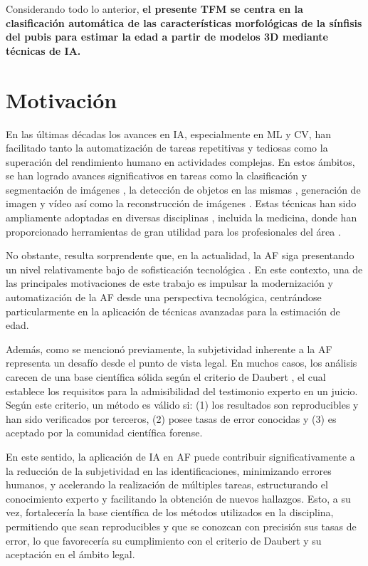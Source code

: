 Considerando todo lo anterior, \textbf{el presente TFM se centra en la clasificación automática de las características morfológicas de la sínfisis del pubis para estimar la edad a partir de modelos 3D mediante técnicas de IA.}

\section{Motivación}
En las últimas décadas los avances en IA, especialmente en ML y CV, han facilitado tanto la automatización de tareas repetitivas y tediosas como la superación del rendimiento humano en actividades complejas. En estos ámbitos, se han logrado avances significativos en tareas como la clasificación y segmentación de imágenes \cite{edozie_comprehensive_2025}, la detección de objetos en las mismas \cite{liu_deep_2020}, generación de imagen y vídeo \cite{wang_generative_2021} así como la reconstrucción de imágenes \cite{xie_review_2022}. Estas técnicas han sido ampliamente adoptadas en diversas disciplinas \cite{chai_deep_2021}, incluida la medicina, donde han proporcionado herramientas de gran utilidad para los profesionales del área \cite{esteva_deep_2021}.

No obstante, resulta sorprendente que, en la actualidad, la AF siga presentando un nivel relativamente bajo de sofisticación tecnológica \cite{RefWorks:RefID:21-mesejo2020survey}. En este contexto, una de las principales motivaciones de este trabajo es impulsar la modernización y automatización de la AF desde una perspectiva tecnológica, centrándose particularmente en la aplicación de técnicas avanzadas para la estimación de edad.

Además, como se mencionó previamente, la subjetividad inherente a la AF representa un desafío desde el punto de vista legal. En muchos casos, los análisis carecen de una base científica sólida según el criterio de Daubert \cite{noauthor_daubert_nodate}, el cual establece los requisitos para la admisibilidad del testimonio experto en un juicio. Según este criterio, un método es válido si: (1) los resultados son reproducibles y han sido verificados por terceros, (2) posee tasas de error conocidas y (3) es aceptado por la comunidad científica forense.

En este sentido, la aplicación de IA en AF puede contribuir significativamente a la reducción de la subjetividad en las identificaciones, minimizando errores humanos, y acelerando la realización de múltiples tareas, estructurando el conocimiento experto y facilitando la obtención de nuevos hallazgos. Esto, a su vez, fortalecería la base científica de los métodos utilizados en la disciplina, permitiendo que sean reproducibles y que se conozcan con precisión sus tasas de error, lo que favorecería su cumplimiento con el criterio de Daubert y su aceptación en el ámbito legal.

